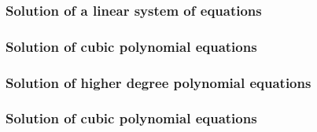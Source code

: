 \subsubsection{Solution of a linear system of equations}
\subsubsection{Solution of cubic polynomial equations}
\subsubsection{Solution of higher degree polynomial equations}
\subsubsection{Solution of cubic polynomial equations}

